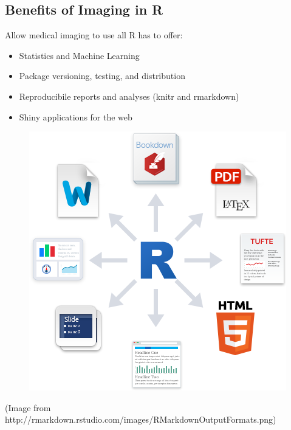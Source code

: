 \documentclass[final]{beamer}\usepackage[]{graphicx}\usepackage[]{color}
\begin{document}
\begin{frame}[fragile]
\begin{table}[!htb]
\begin{minipage}{0.21\linewidth}
% 
% 
% 

\subsection{Benefits of Imaging in R}

Allow medical imaging to use all R has to offer:
  
\begin{multicols}{2}

\begin{itemize}
\item Statistics and Machine Learning
\item Package versioning, testing, and distribution 
\item Reproducibile reports and analyses (knitr and rmarkdown)
\item Shiny applications for the web
\end{itemize}

\vfill
\columnbreak
\begin{figure}[h]
\centering
\includegraphics[width=\linewidth]{figures/RMarkdownOutputFormats.png}
\end{figure}
{\tiny (Image from \\ 
http://rmarkdown.rstudio.com/images/RMarkdownOutputFormats.png)
}
\end{multicols}


\end{minipage}
\end{table}
\end{frame}
\end{document}
